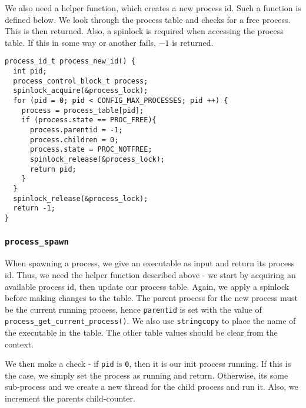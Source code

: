\documentclass[a4paper,12pt]{article}
\begin{document}
We also need a helper function, which creates a new process id. Such a function is defined below. We look through the process table and checks for a free process. This is then returned. Also, a spinlock is required when accessing the process table. If this in some way or another fails, $-1$ is returned.
\begin{lstlisting}
process_id_t process_new_id() {
  int pid;
  process_control_block_t process;
  spinlock_acquire(&process_lock);
  for (pid = 0; pid < CONFIG_MAX_PROCESSES; pid ++) {
    process = process_table[pid];
    if (process.state == PROC_FREE){
      process.parentid = -1;
      process.children = 0;
      process.state = PROC_NOTFREE;
      spinlock_release(&process_lock);
      return pid;
    }
  }
  spinlock_release(&process_lock);
  return -1;
}
\end{lstlisting}

\subsubsection{\texttt{process\_spawn}}

When spawning a process, we give an executable as input and return its process id. Thus, we need the helper function described above - we start by acquiring an available process id, then update our process table. Again, we apply a spinlock before making changes to the table. The parent process for the new process must be the current running process, hence \texttt{parentid} is set with the value of \texttt{process\_get\_current\_process()}. We also use \texttt{stringcopy} to place the name of the executable in the table. The other table values should be clear from the context.

We then make a check - if \texttt{pid} is \texttt{0}, then it is our init process running. If this is the case, we simply set the process as running and return. Otherwise, its some sub-process and we create a new thread for the child process and run it. Also, we increment the parents child-counter.
\end{document}
